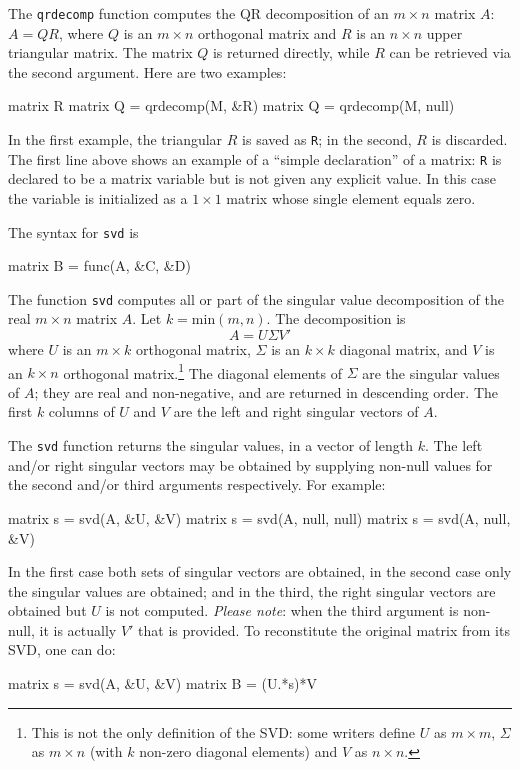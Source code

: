 The \texttt{qrdecomp} function computes the QR decomposition of an $m
\times n$ matrix $A$: $A = QR$, where $Q$ is an $m \times n$
orthogonal matrix and $R$ is an $n \times n$ upper triangular matrix.
The matrix $Q$ is returned directly, while $R$ can be retrieved via
the second argument.  Here are two examples:
%
\begin{code}
matrix R
matrix Q = qrdecomp(M, &R)
matrix Q = qrdecomp(M, null)
\end{code}
%
In the first example, the triangular $R$ is saved as \texttt{R}; in
the second, $R$ is discarded.  The first line above shows an example
of a ``simple declaration'' of a matrix: \texttt{R} is
declared to be a matrix variable but is not given any explicit value.
In this case the variable is initialized as a $1\times 1$ matrix whose
single element equals zero.

The syntax for \texttt{svd} is
%
\begin{code}
matrix B = func(A, &C, &D)
\end{code}
%
The function \texttt{svd} computes all or part of the singular value
decomposition of the real $m \times n$ matrix $A$. Let $k =
\mbox{min}(m, n)$.  The decomposition is
\[
A = U \Sigma V'
\]
where $U$ is an $m \times k$ orthogonal matrix, $\Sigma$ is an $k
\times k$ diagonal matrix, and $V$ is an $k \times n$ orthogonal
matrix.\footnote{This is not the only definition of the SVD: some
  writers define $U$ as $m \times m$, $\Sigma$ as $m \times n$ (with
  $k$ non-zero diagonal elements) and $V$ as $n \times n$.} The
diagonal elements of $\Sigma$ are the singular values of $A$; they are
real and non-negative, and are returned in descending order.  The
first $k$ columns of $U$ and $V$ are the left and right singular
vectors of $A$.

The \texttt{svd} function returns the singular values, in a vector of
length $k$.  The left and/or right singular vectors may be obtained by
supplying non-null values for the second and/or third arguments
respectively.  For example:
%
\begin{code}
matrix s = svd(A, &U, &V)
matrix s = svd(A, null, null)
matrix s = svd(A, null, &V)
\end{code}
%
In the first case both sets of singular vectors are obtained, in the
second case only the singular values are obtained; and in the third,
the right singular vectors are obtained but $U$ is not computed.
\emph{Please note}: when the third argument is non-null, it is
actually $V'$ that is provided.  To reconstitute the original matrix
from its SVD, one can do:
%
\begin{code}
matrix s = svd(A, &U, &V)
matrix B = (U.*s)*V
\end{code}
%


